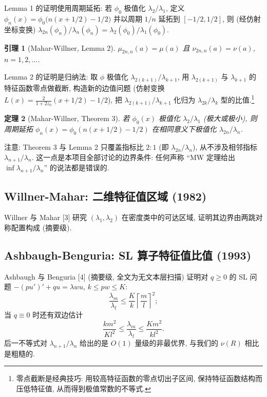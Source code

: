 \documentclass[UTF8]{ctexart}
\newtheorem{theorem}{定理}[section]
\newtheorem{lemma}[theorem]{引理}
\begin{document}
Lemma 1 的证明使用周期延拓: 若 $\phi_0$ 极值化 $\lambda_2/\lambda_1$, 定义
$\phi_n(x) = \phi_0\bigl(n(x+1/2)-1/2\bigr)$ 并以周期 $1/n$ 延拓到 $[-1/2, 1/2]$,
则 (经仿射坐标变换) $\lambda_{2n}(\phi_n)/\lambda_n(\phi_n) = \lambda_2(\phi_0)/\lambda_1(\phi_0)$.

\begin{lemma}[Mahar-Willner, Lemma 2]
$\mu_{2n,n}(a) = \mu(a)$ 且 $\nu_{2n,n}(a) = \nu(a)$, $n = 1, 2, \dots$.
\end{lemma}

Lemma 2 的证明是归纳法: 取 $\phi$ 极值化 $\lambda_{2(k+1)}/\lambda_{k+1}$, 用
$\lambda_{2(k+1)}$ 与 $\lambda_{k+1}$ 的特征函数零点做截断, 构造新的边值问题
(仿射变换 $L(x) = \frac{2}{1+2z_0}(x+1/2)-1/2$), 把 $\lambda_{2(k+1)}/\lambda_{k+1}$
化归为 $\lambda_{2k}/\lambda_k$ 型的比值.\footnote{零点截断是经典技巧: 用较高特征函数的零点切出子区间, 保持特征函数结构而压低特征值, 从而得到极值常数的不等式.}

\begin{theorem}[Mahar-Willner, Theorem 3]
若 $\phi_0(x)$ 极值化 $\lambda_2/\lambda_1$ (极大或极小), 则周期延拓
$\phi_n(x) = \phi_0(n(x+1/2)-1/2)$ 在相同意义下极值化 $\lambda_{2n}/\lambda_n$.
\end{theorem}

注意: Theorem 3 与 Lemma 2 只覆盖指标比 $2:1$ (即 $\lambda_{2n}/\lambda_n$), 从不涉及相邻指标
$\lambda_{n+1}/\lambda_n$. 这一点是本项目全部讨论的边界条件: 任何声称 ``MW 定理给出
$\inf \lambda_{n+1}/\lambda_n$'' 的说法都是错误的.

\subsection{Willner-Mahar: 二维特征值区域 (1982)}

Willner 与 Mahar [3] 研究 $(\lambda_1, \lambda_2)$ 在密度类中的可达区域, 证明其边界由两跳对称配置构成 (摘要级).

\subsection{Ashbaugh-Benguria: SL 算子特征值比值 (1993)}

Ashbaugh 与 Benguria [4] (摘要级, 全文为无文本层扫描) 证明对
$q \geq 0$ 的 SL 问题 $-(pu')' + qu = \lambda w u$, $k \leq pw \leq K$:
\begin{equation}
	\frac{\lambda_m}{\lambda_l} \leq \frac{K}{k} \left\lceil \frac{m}{l} \right\rceil^2;
\end{equation}
当 $q \equiv 0$ 时还有双边估计
\begin{equation}
	\frac{k m^2}{K l^2} \leq \frac{\lambda_m}{\lambda_l} \leq \frac{K m^2}{k l^2}.
\end{equation}
后一不等式对 $\lambda_{n+1}/\lambda_n$ 给出的是 $O(1)$ 量级的非最优界, 与我们的 $\nu(R)$ 相比是粗糙的.
\end{document}
